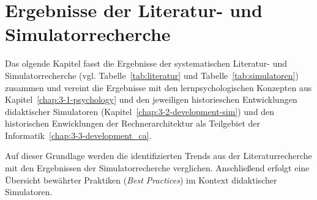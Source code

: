 \chapter{Ergebnisse der Literatur- und Simulatorrecherche}\label{chap:4-results}

Das olgende Kapitel fasst die Ergebnisse der systematischen Literatur- und Simulatorrecherche (vgl. Tabelle~\ref{tab:literatur} und Tabelle~\ref{tab:simulatoren}) zusammen und vereint die Ergebnisse mit den lernpsychologischen Konzepten aus Kapitel~\ref{chap:3-1-psychology} und den jeweiligen historieschen Entwicklungen didaktischer Simulatoren (Kapitel~\ref{chap:3-2-development-sim}) und den historischen Enwicklungen der Rechnerarchitektur als Teilgebiet der Informatik~\ref{chap:3-3-development_ca}.

Auf dieser Grundlage werden die identifizierten Trends aus der Literaturrecherche mit den Ergebnissen der Simulatorrecherche verglichen. Anschließend erfolgt eine Übersicht bewährter Praktiken (\textit{Best Practices}) im Kontext didaktischer Simulatoren.




